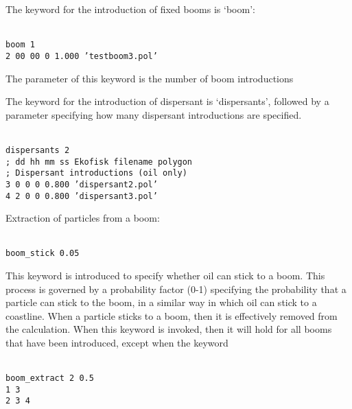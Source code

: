 \documentclass[english]{deltares_manual}
\newcommand\tab[1][1cm]{\hspace*{#1}}
\begin{document}
The keyword for the introduction of fixed booms is ‘boom’:
\begin{tcolorbox}
	\footnotesize
	\texttt{\\
boom  1    \\
2 00 00  0         1.000           'testboom3.pol'
}
\end{tcolorbox}
The parameter of this keyword is the number of boom introductions

The keyword for the introduction of dispersant is ‘dispersants’, followed by a parameter specifying how many dispersant introductions are specified. 
\begin{tcolorbox}
	\footnotesize
	\texttt{\\
dispersants 2 \\
; dd hh mm ss        Ekofisk         filename polygon \\
; \tab                         Dispersant introductions (oil only)\\
3  0 0  0 \tab          0.800           'dispersant2.pol' \\
4  2 0  0  \tab         0.800           'dispersant3.pol' \\
}
\end{tcolorbox}

Extraction of particles from a boom:
\begin{tcolorbox}
	\footnotesize
	\texttt{\\
boom\_stick 0.05
}
\end{tcolorbox}

This keyword is introduced to specify whether oil can stick to a boom. This process is governed by a probability factor (0-1) specifying the probability that a particle can stick to the boom, in a similar way in which oil can stick to a coastline. When a particle sticks to a boom, then it is effectively removed from the calculation. When this keyword is invoked, then it will hold for all booms that have been introduced, except when the keyword 

\begin{tcolorbox}
	\footnotesize
	\texttt{\\
boom\_extract  2 0.5 \\
1 3\\
2 3 4\\
}
\end{tcolorbox}
\end{document}

